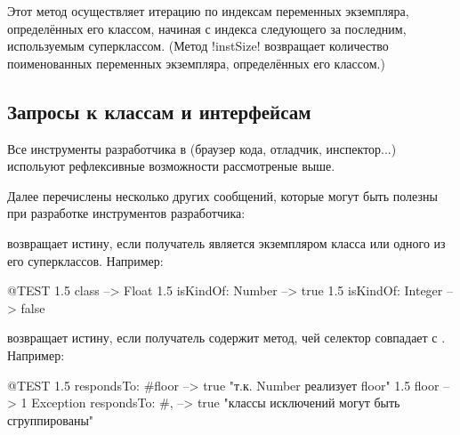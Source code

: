 \documentclass[a4paper,10pt,twoside]{book}
\begin{document}
Этот метод осуществляет итерацию по индексам переменных экземпляра, определённых его классом, начиная с индекса следующего за последним, используемым суперклассом.
(Метод \ct!instSize! возвращает количество поименованных переменных экземпляра, определённых его классом.)

\subsection{Запросы к классам и интерфейсам}

Все инструменты разработчика в \pharo (браузер кода, отладчик, инспектор...) испольуют рефлексивные возможности рассмотреные выше.

Далее перечислены несколько других сообщений, которые могут быть полезны при разработке инструментов разработчика:

 возвращает истину, если получатель является экземпляром класса  или одного из его суперклассов.
Например:
\begin{code}{@TEST}
1.5 class                     --> Float
1.5 isKindOf: Number --> true
1.5 isKindOf: Integer   --> false
\end{code}

 возвращает истину, если получатель содержит метод, чей селектор совпадает с .
Например:
\begin{code}{@TEST}
1.5 respondsTo: #floor      --> true    "т.к. Number реализует floor"
1.5 floor                            --> 1
Exception respondsTo: #, --> true    "классы исключений могут быть сгруппированы"
\end{code}
\end{document}
